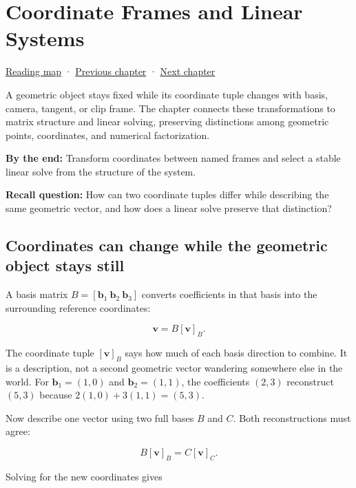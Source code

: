 \chapter{Coordinate Frames and Linear Systems}\label{01-foundations-i-ch019-coordinate-frames-and-linear-systems}\hypertarget{01-foundations-i-ch019}{}\label{stagechapter:01-foundations-i-ch019}

\hyperref[volume-reading-map]{Reading map} · \hyperref[01-foundations-i-ch018-vectors-for-light-and-frames]{Previous chapter} · \hyperref[01-foundations-i-ch020-choose-matrix-factorizations-from-structure]{Next chapter}

A geometric object stays fixed while its coordinate tuple changes with basis, camera, tangent, or clip frame. The chapter connects these transformations to matrix structure and linear solving, preserving distinctions among geometric points, coordinates, and numerical factorization.

\textbf{By the end:} Transform coordinates between named frames and select a stable linear solve from the structure of the system.

\textbf{Recall question:} How can two coordinate tuples differ while describing the same geometric vector, and how does a linear solve preserve that distinction?

\section{Coordinates can change while the geometric object stays still}\label{01-foundations-i-ch019-coordinates-can-change-while-the-geometric-object-stays-still}

A basis matrix \(B=[\mathbf b_1\ \mathbf b_2\ \mathbf b_3]\) converts coefficients in that basis into the surrounding reference coordinates:

\[
\mathbf v=B[\mathbf v]_B.
\]

The coordinate tuple \([\mathbf v]_B\) says how much of each basis direction to combine. It is a description, not a second geometric vector wandering somewhere else in the world. For \(\mathbf b_1=(1,0)\) and \(\mathbf b_2=(1,1)\), the coefficients \((2,3)\) reconstruct \((5,3)\) because \(2(1,0)+3(1,1)=(5,3)\).

Now describe one vector using two full bases \(B\) and \(C\). Both reconstructions must agree:

\[
B[\mathbf v]_B=C[\mathbf v]_C.
\]

Solving for the new coordinates gives


